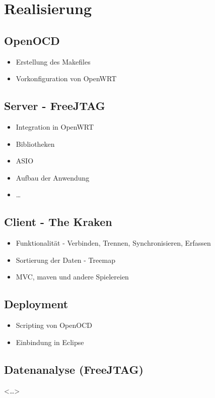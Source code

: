 \chapter{Realisierung}
\section{OpenOCD}
\begin{itemize}
  \item Erstellung des Makefiles 
  \item Vorkonfiguration von OpenWRT
\end{itemize}
\section{Server - FreeJTAG}
\begin{itemize}
  \item Integration in OpenWRT
  \item Bibliotheken
  \item ASIO
  \item Aufbau der Anwendung
  \item \ldots
\end{itemize}
\section{Client - The Kraken}
\begin{itemize}
  \item Funktionalität - Verbinden, Trennen, Synchronisieren, Erfassen
  \item Sortierung der Daten - Treemap
  \item MVC, maven und andere Spielereien
\end{itemize}
\section{Deployment}
\begin{itemize}
  \item Scripting von OpenOCD
  \item Einbindung in Eclipse
\end{itemize}
\section{Datenanalyse (FreeJTAG)}
<\ldots>